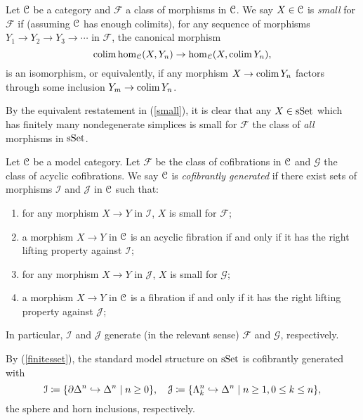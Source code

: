 \renewcommand{\F}{\mathcal{F}}
\renewcommand{\G}{\mathcal{G}}

\begin{definition}
  \label{small}
  Let $\mathcal{C}$ be a category and $\F$ a class of morphisms in $\mathcal{C}$. We say
  $X \in \mathcal{C}$ is \emph{small} for $\F$ if (assuming $\mathcal{C}$ has enough
  colimits), for any sequence of morphisms $Y_1 \to Y_2 \to Y_3 \to
  \cdots$ in $\F$, the canonical morphism
  \[
  \operatorname{colim} \operatorname{hom}_{\mathcal{C}}(X,Y_n) \to \operatorname{hom}_{\mathcal{C}}(X,\operatorname{colim} Y_n),
  \]
  is an isomorphism, or equivalently, if any morphism $X \to \operatorname{colim}
  Y_n$ factors through some inclusion $Y_m \to \operatorname{colim} Y_n$.
\end{definition}

\begin{example}
  \label{finitesset}
  By the equivalent restatement in (\ref{small}), it is clear that any
  $X \in \mathrm{s}\mathrm{Set}$ which has finitely many nondegenerate simplices is
  small for $\F$ the class of \emph{all} morphisms in $\mathrm{s}\mathrm{Set}$.
\end{example}

\renewcommand{\I}{\mathcal{I}}
\renewcommand{\J}{\mathcal{J}}

\begin{definition}
  Let $\mathcal{C}$ be a model category. Let $\F$ be the class of cofibrations
  in $\mathcal{C}$ and $\G$ the class of acyclic cofibrations. We say $\mathcal{C}$ is
  \emph{cofibrantly generated} if there exist sets of morphisms $\I$
  and $\J$ in $\mathcal{C}$ such that:
  \begin{enumerate}
  \item for any morphism $X \to Y$ in $\I$, $X$ is small for $\F$;
  \item a morphism $X \to Y$ in $\mathcal{C}$ is an acyclic fibration if and
    only if it has the right lifting property against $\I$;
  \item for any morphism $X \to Y$ in $\J$, $X$ is small for $\G$;
  \item a morphism $X \to Y$ in $\mathcal{C}$ is a fibration if and only if it
    has the right lifting property against $\J$;
  \end{enumerate}
  In particular, $\I$ and $\J$ generate (in the relevant sense) $\F$
  and $\G$, respectively.
\end{definition}

\begin{example}
  By (\ref{finitesset}), the standard model structure on $\mathrm{s}\mathrm{Set}$ is
  cofibrantly generated with
  \[
  \I \coloneqq \{\del\Delta^n \inj \Delta^n \mid n \ge 0\}, \quad \J
  \coloneqq \{\Lambda^n_k \inj \Delta^n \mid n \ge 1, 0 \le k \le n\},
  \]
  the sphere and horn inclusions, respectively.
\end{example}

